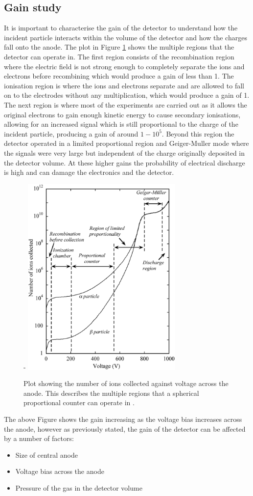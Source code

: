 \documentclass[a4paper]{article}
\begin{document}
\subsection{Gain study} \label{gain}
It is important to characterise the gain of the detector to understand how the incident particle interacts within the volume of the detector and how the charges fall onto the anode. The plot in Figure \ref{fig:gain} shows the multiple regions that the detector can operate in. The first region consists of the recombination region where the electric field is not strong enough to completely separate the ions and electrons before recombining which would produce a gain of less than 1. The ionisation region is where the ions and electrons separate and are allowed to fall on to the electrodes without any multiplication, which would produce a gain of 1. The next region is where most of the experiments are carried out as it allows the original electrons to gain enough kinetic energy to cause secondary ionisations, allowing for an increased signal which is still proportional to the charge of the incident particle, producing a gain of around $1-10^5$. Beyond this region the detector operated in a limited proportional region and Geiger-Muller mode where the signals were very large but independent of the charge originally deposited in the detector volume. At these higher gains the probability of electrical discharge is high and can damage the electronics and the detector.
\begin{figure}[H]-
    \centering
    \includegraphics[height=10cm]{plots/gain.png}
    \caption{Plot showing the number of ions collected against voltage across the anode. This describes the multiple regions that a spherical proportional counter can operate in \cite{sauli_2014}.}
    \label{fig:gain}
\end{figure}
\noindent The above Figure shows the gain increasing as the voltage bias increases across the anode, however as previously stated, the gain of the detector can be affected by a number of factors:
\begin{itemize}
    \item {Size of central anode}
    \item {Voltage bias across the anode}
    \item {Pressure of the gas in the detector volume}
\end{itemize}
\end{document}
